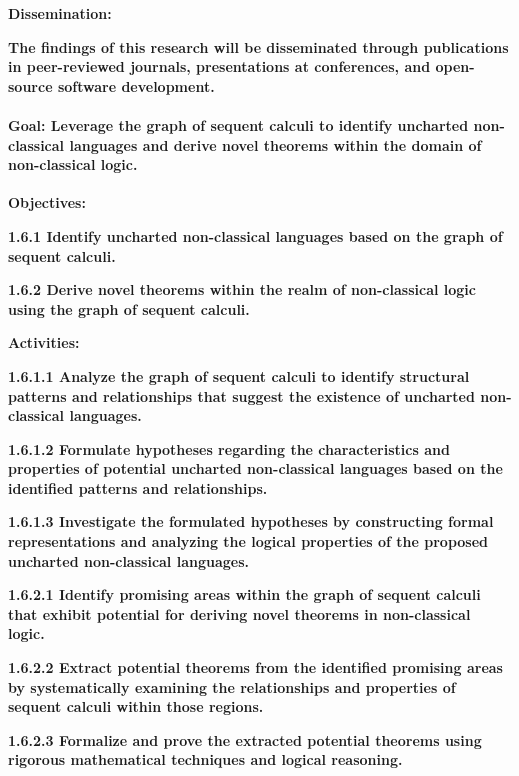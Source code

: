 \textbf{Dissemination:}

\textbf{The findings of this research will be disseminated through
publications in peer-reviewed journals, presentations at conferences,
and open-source software development.}

\hypertarget{goal-leverage-the-graph-of-sequent-calculi-to-identify-uncharted-non-classical-languages-and-derive-novel-theorems-within-the-domain-of-non-classical-logic.}{%
\paragraph{Goal: Leverage the graph of sequent calculi to identify
uncharted non-classical languages and derive novel theorems within the
domain of non-classical
logic.}\label{goal-leverage-the-graph-of-sequent-calculi-to-identify-uncharted-non-classical-languages-and-derive-novel-theorems-within-the-domain-of-non-classical-logic.}}

\textbf{Objectives:}

\textbf{1.6.1 Identify uncharted non-classical languages based on the
graph of sequent calculi.}

\textbf{1.6.2 Derive novel theorems within the realm of non-classical
logic using the graph of sequent calculi.}

\textbf{Activities:}

\textbf{1.6.1.1 Analyze the graph of sequent calculi to identify
structural patterns and relationships that suggest the existence of
uncharted non-classical languages.}

\textbf{1.6.1.2 Formulate hypotheses regarding the characteristics and
properties of potential uncharted non-classical languages based on the
identified patterns and relationships.}

\textbf{1.6.1.3 Investigate the formulated hypotheses by constructing
formal representations and analyzing the logical properties of the
proposed uncharted non-classical languages.}

\textbf{1.6.2.1 Identify promising areas within the graph of sequent
calculi that exhibit potential for deriving novel theorems in
non-classical logic.}

\textbf{1.6.2.2 Extract potential theorems from the identified promising
areas by systematically examining the relationships and properties of
sequent calculi within those regions.}

\textbf{1.6.2.3 Formalize and prove the extracted potential theorems
using rigorous mathematical techniques and logical reasoning.}

